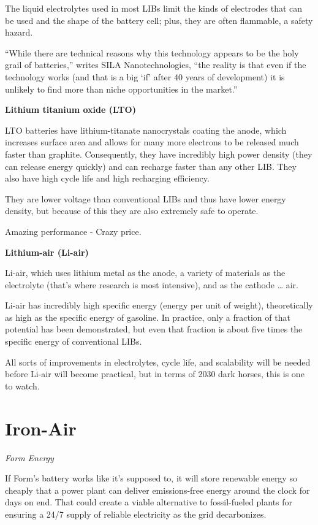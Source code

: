 \documentclass[
]{book}
\begin{document}
The liquid electrolytes used in most LIBs limit the kinds of electrodes that can be used and the shape of the battery cell; plus, they are often flammable, a safety hazard.

``While there are technical reasons why this technology appears to be the holy grail of batteries,'' writes SILA Nanotechnologies, ``the reality is that even if the technology works (and that is a big `if' after 40 years of development) it is unlikely to find more than niche opportunities in the market.''

\textbf{Lithium titanium oxide (LTO) }

LTO batteries have lithium-titanate nanocrystals coating the anode, which increases surface area and allows for many more electrons to be released much faster than graphite. Consequently, they have incredibly high power density (they can release energy quickly) and can recharge faster than any other LIB. They also have high cycle life and high recharging efficiency.

They are lower voltage than conventional LIBs and thus have lower energy density, but because of this they are also extremely safe to operate.

Amazing performance - Crazy price.

\textbf{Lithium-air (Li-air)}

Li-air, which uses lithium metal as the anode, a variety of materials as the electrolyte (that's where research is most intensive), and as the cathode \ldots{} air.

Li-air has incredibly high specific energy (energy per unit of weight), theoretically as high as the specific energy of gasoline. In practice, only a fraction of that potential has been demonstrated, but even that fraction is about five times the specific energy of conventional LIBs.

All sorts of improvements in electrolytes, cycle life, and scalability will be needed before Li-air will become practical, but in terms of 2030 dark horses, this is one to watch.

\hypertarget{iron-air}{%
\section{Iron-Air}\label{iron-air}}

\emph{Form Energy}

If Form's battery works like it's supposed to, it will store renewable energy so cheaply that a power plant can deliver emissions-free energy around the clock for days on end. That could create a viable alternative to fossil-fueled plants for ensuring a 24/7 supply of reliable electricity as the grid decarbonizes.
\end{document}
